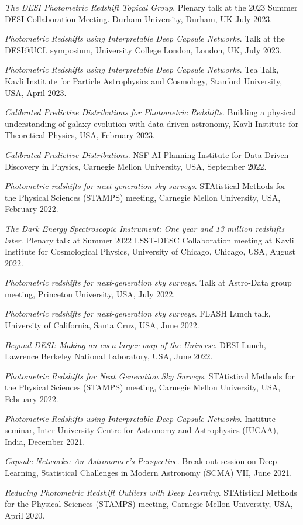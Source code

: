 \begin{etaremune}[leftmargin=40pt,labelsep=10pt]
    \item \textit{The DESI Photometric Redshift Topical Group}, Plenary talk at the 2023 Summer DESI Collaboration Meeting. Durham University, Durham, UK July 2023.
    \item \textit{Photometric Redshifts using Interpretable Deep Capsule Networks}. Talk at the DESI@UCL symposium, University College London, London, UK, July 2023.
    \item \textit{Photometric Redshifts using Interpretable Deep Capsule Networks}. Tea Talk, Kavli Institute for Particle Astrophysics and Cosmology, Stanford University, USA, April 2023.
    \item \textit{Calibrated Predictive Distributions for Photometric Redshifts}. Building a physical understanding of galaxy evolution with data-driven astronomy, Kavli Institute for Theoretical Physics, USA, February 2023.
    \item \textit{Calibrated Predictive Distributions}. NSF AI Planning Institute for Data-Driven Discovery in Physics, Carnegie Mellon University, USA, September 2022.
 
    \item \textit{Photometric redshifts for next generation sky surveys}. STAtistical Methods for the Physical Sciences (STAMPS) meeting, Carnegie Mellon University, USA, February 2022.
 
    \item \textit{The Dark Energy Spectroscopic Instrument: One year and 13 million redshifts later}. Plenary talk at Summer 2022 LSST-DESC Collaboration meeting at Kavli Institute for Cosmological Physics, University of Chicago, Chicago, USA, August 2022.
    \item \textit{Photometric redshifts for next-generation sky surveys}. Talk at Astro-Data group meeting, Princeton University, USA, July 2022.
    \item \textit{Photometric redshifts for next-generation sky surveys}. FLASH Lunch talk, University of California, Santa Cruz, USA, June 2022.
    \item \textit{Beyond DESI: Making an even larger map of the Universe}. DESI Lunch, Lawrence Berkeley National Laboratory, USA, June 2022.
    \item \textit{Photometric Redshifts for Next Generation Sky Surveys}. STAtistical Methods for the Physical Sciences (STAMPS) meeting, Carnegie Mellon University, USA, February 2022.
    \item \textit{Photometric Redshifts using Interpretable Deep Capsule Networks}. Institute seminar, Inter-University Centre for Astronomy and Astrophysics (IUCAA), India,  December 2021.
     \item \textit{Capsule Networks: An Astronomer's Perspective}. Break-out session on Deep Learning, Statistical Challenges in Modern Astronomy (SCMA) VII,  June 2021.
    \item \textit{Reducing Photometric Redshift Outliers with Deep Learning}. STAtistical Methods for the Physical Sciences (STAMPS) meeting, Carnegie Mellon University, USA, April 2020.
\end{etaremune}
